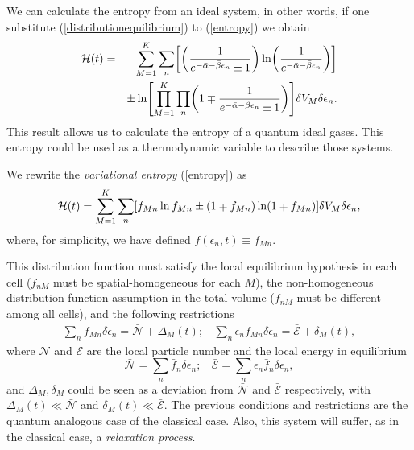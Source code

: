 We can calculate the entropy from an ideal system, in other words, if one
substitute (\ref{distributionequilibrium}) to (\ref{entropy}) we obtain
%
\begin{eqnarray}
      \mathcal{H}(t)&=&\sum_{M=1}^{K} \sum_n  \left[\left(\frac{1}{e^{-\bar{\alpha}-\bar{\beta}\epsilon_{n}}\pm 1} \right)\ln \left(\frac{1}{e^{-\bar{\alpha}-\bar{\beta}\epsilon_{n}}} \right) \right]\nonumber \\
      &&\pm  \ln \left[\prod_{M=1}^{K} \prod_{n}\left(1 \mp \frac{1}{e^{-\bar{\alpha}-\bar{\beta}\epsilon_{n}}\pm 1} \right) \right] \de V_M \delta \epsilon_n\label{H-entropy}.
  \end{eqnarray}
%
This result allows us to calculate the entropy of a quantum ideal gases. This
entropy could be used as a thermodynamic variable to describe those systems.
 
 
We rewrite the \textit{variational entropy} (\ref{entropy}) as
%
\begin{equation}
    \mathcal{H}(t)=\sum_{M=1}^{K} \sum_{n} \left[ f_{Mn} \ln f_{Mn} \pm (1 \mp f_{Mn}) \ln (1 \mp f_{Mn}) \right] \de V_M \delta \epsilon_n \label{entropy2},
\end{equation}
%
where, for simplicity, we have defined $f(\epsilon_{n},t)\equiv f_{Mn}$.

This distribution function must satisfy the local equilibrium hypothesis in
each cell ($f_{nM}$ must be spatial-homogeneous for each $M$), the
non-homogeneous distribution function assumption in the total volume ($f_{nM}$
must be different among all cells), and the following restrictions
%
\begin{eqnarray}
        \sum_{n}f_{Mn} \delta \epsilon_n=\bar{\mathcal{N}}+\Delta_M(t); \ \ \ \ \sum_{n}\epsilon_{n}f_{Mn} \delta \epsilon_n=\bar{\mathcal{E}}+ \delta_M(t), \label{restrictionoutside}
  \end{eqnarray}
%
where $\bar {\mathcal{N}}$ and $\bar{\mathcal{E}}$ are the local particle
number and the local energy in equilibrium
%
\begin{equation}
      \bar{\mathcal{N}}= \sum_n \bar{f}_n \delta \epsilon_n; \ \ \ \ \bar{\mathcal{E}}= \sum_n \epsilon_n\bar{f}_n \delta \epsilon_n,
  \end{equation}
%
and $\Delta_M,\delta_M$ could be seen as a deviation from $\bar{\mathcal{N}}$
and $\bar{\mathcal{E}}$ respectively, with $\Delta_M(t)\ll \bar{\mathcal{N}}$
and $\delta_M(t) \ll \bar{\mathcal{E}}$. The previous conditions and
restrictions are the quantum analogous case of the classical case. Also, this
system will suffer, as in the classical case, a \textit{relaxation process}.

